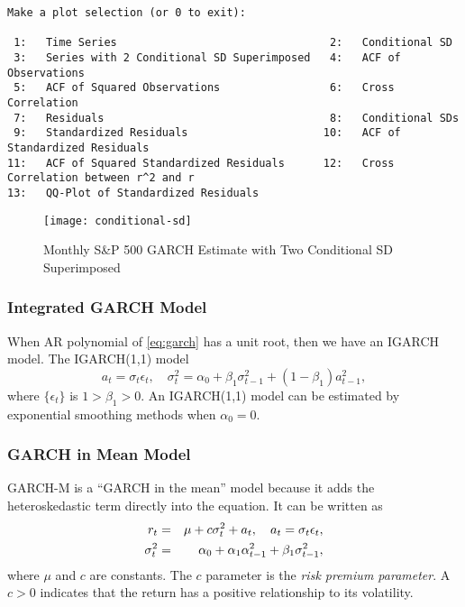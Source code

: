 \begin{footnotesize}
\begin{verbatim}
Make a plot selection (or 0 to exit): 

 1:   Time Series                                 2:   Conditional SD                           
 3:   Series with 2 Conditional SD Superimposed   4:   ACF of Observations                      
 5:   ACF of Squared Observations                 6:   Cross Correlation                        
 7:   Residuals                                   8:   Conditional SDs                          
 9:   Standardized Residuals                     10:   ACF of Standardized Residuals            
11:   ACF of Squared Standardized Residuals      12:   Cross Correlation between r^2 and r      
13:   QQ-Plot of Standardized Residuals          
\end{verbatim}
\end{footnotesize}

\begin{figure}[tb]
	\centering
	\texttt{[image: conditional-sd]}
	\caption[S\&P 500 GARCH Estimate]{Monthly S\&P 500 GARCH Estimate with Two Conditional SD Superimposed}
	\label{figure:conditional-sd}
\end{figure}

\subsubsection{Integrated GARCH Model}
When AR polynomial of \eqref{eq:garch} has a unit root, then we have an IGARCH model.
The IGARCH(1,1) model
\begin{equation}
a_t = \sigma_t \epsilon_t, \quad \sigma^2_t = \alpha_0 + \beta_1 \sigma^2_{t-1} + (1-\beta_1)a^2_{t-1},
\label{eq:igarch}
\end{equation}
where $\{\epsilon_t\}$ is $1>\beta_1>0$. An IGARCH(1,1) model can be estimated by exponential smoothing methods when $\alpha_0=0$.

\subsubsection{GARCH in Mean Model}
GARCH-M is a ``GARCH in the mean'' model because it adds the heteroskedastic term directly into the equation. It can be written as
\begin{eqnarray}
r_t &=& \mu + c\sigma^2_t + a_t, \quad a_t=\sigma_t \epsilon_t, \notag \\
\sigma^2_t &=& \alpha_0 + \alpha_1\alpha^2_{t-1} + \beta_1\sigma^2_{t-1},
\label{eq:garch-m}
\end{eqnarray}
where $\mu$ and $c$ are constants. The $c$ parameter is the \emph{risk premium parameter}. A $c>0$ indicates that the return has a positive relationship to its volatility.

